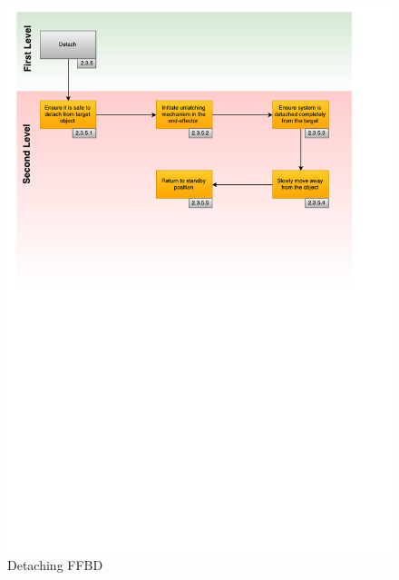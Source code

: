 \begin{figure}[H]
\centering
\includegraphics[width=\textwidth, height=0.94\textheight, keepaspectratio]{Figures/FFBD_detach}
\caption{Detaching \acrshort{FFBD}}
\label{fig:FFBD_detach}
\end{figure}